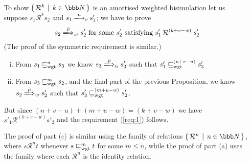 \documentclass{LMCS}
\newcommand{\nats}{\ensuremath{\bbb N}\xspace}
\newcommand{\amort}[1]{\mathrel{\sqsubseteq_{\rm wgt}^{#1}}}
\newcommand{\setof}[2]{\{ \, #1 \, \mid \, #2 \, \}}\newcommand{\sset}[1]{\{ {#1}  \}  }
\newcommand{\calR}{\mathbin{\mathcal{R}}}
\newcommand{\ar}[1]{\mathbin{\xlongrightarrow{ #1}}}
\newcommand{\dar}[1]{\xLongrightarrow{\vspace{-2em}#1}}
\begin{document}
To show $\setof{ \calR^k}{ k \in \nats}$ is an amortised weighted
bisimulation let us suppose $s_1 \calR^k s_2$ and $s_1 \ar{\mu}_v
s'_1$; we have to prove
\begin{align}\label{req:1}
  s_2 \dar{\hat{\mu}}_w s_2' \;\text{for some $s'_2$ satisfying}\; 
s'_1 \calR^{(k+v-w)} s'_2
\end{align}
(The proof of the symmetric requirement is similar.)
\begin{enumerate}[(i)]
\item From $s_1 \amort{n} s_3$ we know $s_3 \dar{\hat{\mu}}_u s'_3$ such that 
$s'_1 \amort{(n+v-u)} s'_3$

\item From $s_3 \amort{m} s_2$, and the final part of the previous Proposition,
we know $s_2 \dar{\hat{\mu}}_w s'_2$ such that 
$s'_3 \amort{(m+u-w)} s'_2$.
\end{enumerate}
But since $(n+v-u) + (m+u-w) = (k+v-w)$ we have
$s'_1 \calR^{(k+v-w)} s'_2$ and the requirement (\ref{req:1}) follows. 

The proof of part (c) is similar using the family of relations
$\setof{\calR^n}{n \in \nats}$, where $s \calR^n t$ whenever $s \amort{m}
t$ for some $m \leq n$, while the proof of part (a) uses the family
where each $\calR^n$ is the identity relation.
\end{document}
